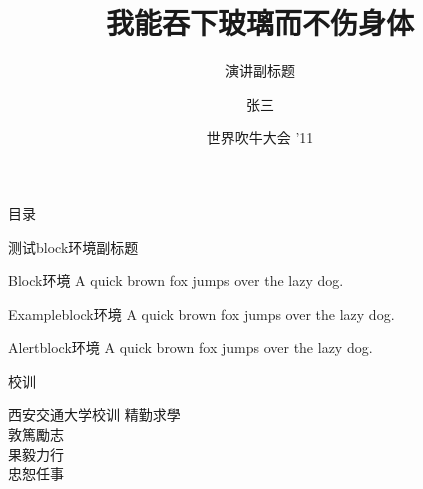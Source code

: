 \documentclass{beamer}
\title[演讲标题]
{我能吞下玻璃而不伤身体}
\subtitle{演讲副标题} %
\author[zhangsan123]
{张三} %
\institute[Xi'an Jiaotong University] %
{
  西安交通大学
}
\date[Short Occasion] %
{世界吹牛大会 '11}
\begin{document}
\begin{frame}
  \titlepage
\end{frame}

\begin{frame}{目录}
  \tableofcontents %
\end{frame}

\begin{frame}{测试block环境}{副标题}
    \begin{block}{Block环境}
        A quick brown fox jumps over the lazy dog.
    \end{block} \pause

    \begin{exampleblock}{Exampleblock环境}
        A quick brown fox jumps over the lazy dog.
    \end{exampleblock} \pause

    \begin{alertblock}{Alertblock环境}
        A quick brown fox jumps over the lazy dog.
    \end{alertblock} 
\end{frame}

\begin{frame}{校训}

    \begin{block}{西安交通大学校训}
        \centering \Huge
        精勤求學
        \\ \pause
        敦篤勵志
        \\ \pause
        果毅力行
        \\ \pause
        忠恕任事
    \end{block}

\end{frame}
\end{document}
